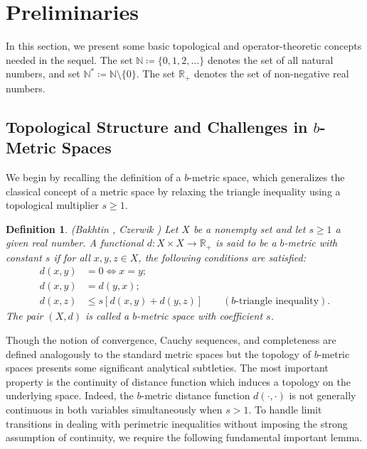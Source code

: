 \documentclass[a4paper,12pt,oneside]{article}
\newtheorem{definition}[theorem]{Definition}
\numberwithin{equation}{section}
\begin{document}
\section{Preliminaries}
In this section, we present some basic topological and operator-theoretic concepts needed in the sequel. The set $\mathbb{N} \coloneqq \{0, 1, 2, \ldots \}$ denotes the set of all natural numbers, and set $\mathbb{N}^* \coloneqq \mathbb{N} \setminus \{0\}$. The set $\mathbb{R}_+$ denotes the set of non-negative real numbers.

\subsection{Topological Structure and Challenges in $b$-Metric Spaces}
We begin by recalling the definition of a $b$-metric space, which generalizes the classical concept of a metric space by relaxing the triangle inequality using a topological multiplier $s \geq 1$.

\begin{definition}
\label{def:bmetric}
(Bakhtin \cite{bakhtin1989}, Czerwik \cite{czerwik1993}) Let $X$ be a nonempty set and let $s \geq 1$  a given real number. A functional $d: X \times X \to \mathbb{R}_+$ is said to be a $b$-metric with constant $s$ if for all $x, y, z \in X$, the following conditions are satisfied:
\begin{align}
d(x,y) &= 0 \iff x = y; \label{eq:bmetric_zero}\\
d(x,y) &= d(y,x); \label{eq:bmetric_sym}\\
d(x,z) &\leq s[d(x,y) + d(y,z)] \qquad (b\text{-triangle inequality}). \label{eq:bmetric_tri_def}
\end{align}
The pair $(X,d)$ is called a $b$-metric space with coefficient $s$.
\end{definition}

Though the notion of convergence, Cauchy sequences, and completeness are defined analogously to the standard metric spaces but the topology of $b$-metric spaces presents some significant analytical subtleties. The most important property is the continuity of distance function which induces a topology on the underlying space. Indeed, the $b$-metric distance function $d(\cdot,\cdot)$ is not generally continuous in both variables simultaneously when $s > 1$. To handle limit transitions in dealing with perimetric inequalities without imposing the strong assumption of continuity, we require the following fundamental important lemma.
\end{document}
